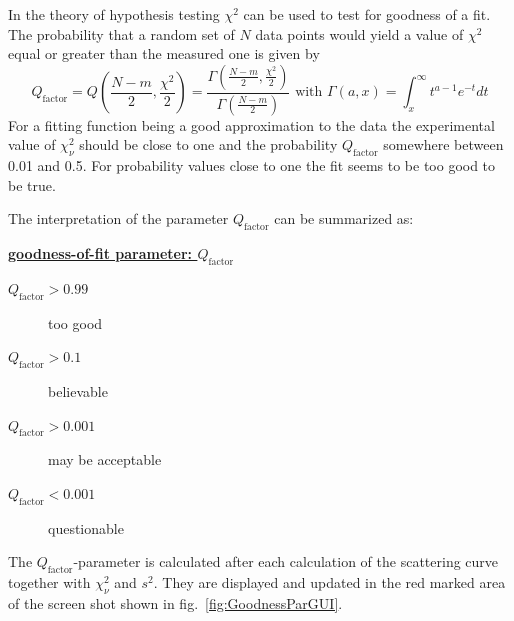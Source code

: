 In the theory of hypothesis testing $\chi^2$ can be used to test
for goodness of a fit. The probability that a random set of $N$ data points
would yield a value of $\chi^2$ equal or greater than the measured
one is given by
\begin{equation}
\displaystyle Q_\text{factor} =
Q\left(\frac{N-m}{2},\frac{\chi^2}{2}\right) =
\frac{\Gamma\left(\frac{N-m}{2},\frac{\chi^2}{2}\right)}{\Gamma\left(\frac{N-m}{2}\right)}
\text{ with } \Gamma\left(a,x\right) =  \int_x^\infty t^{a-1}e^{-t}
dt
\end{equation}
For a fitting function being a good approximation to the data the experimental
value of $\chi^2_\nu$ should be close to one and the probability
$Q_\text{factor}$ somewhere between 0.01 and 0.5. For probability values
close to one the fit seems to be too good to be true.

\vspace{5mm}

The interpretation of the parameter $Q_\text{factor}$ can be summarized as:

\vspace{5mm}

\uline{\bf goodness-of-fit parameter: $Q_\text{factor}$}
\begin{description}
 \item[$Q_\text{factor}>0.99$] too good
 \item[$Q_\text{factor}>0.1$] believable
 \item[$Q_\text{factor}>0.001$] may be acceptable
 \item[$Q_\text{factor}<0.001$] questionable
\end{description}

\vspace{5mm}

The $Q_\text{factor}$-parameter is calculated after each calculation of the scattering curve together with $\chi^2_\nu$ and $s^2$. They are displayed and updated in the red marked area of the screen shot shown in fig.\ \ref{fig:GoodnessParGUI}.

~\\
